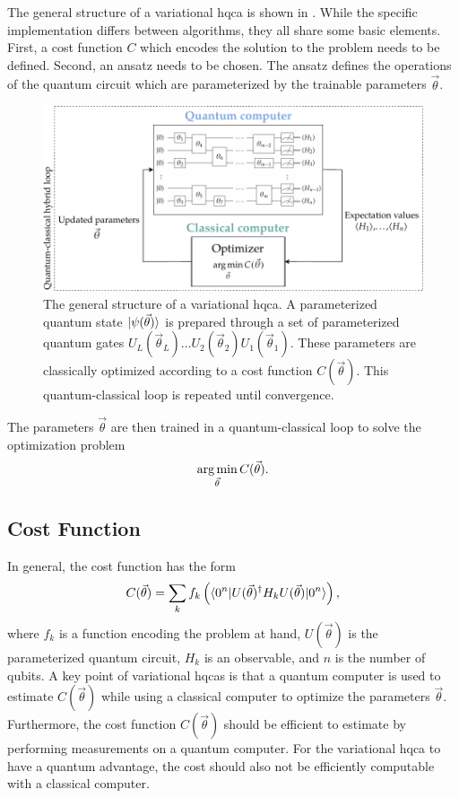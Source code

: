 The general structure of a variational \gls{hqca} is shown in .
While the specific implementation differs between algorithms, they all share some basic elements.
First, a cost function $C$ which encodes the solution to the problem needs to be defined.
Second, an ansatz needs to be chosen.
The ansatz defines the operations of the quantum circuit which are parameterized by the trainable parameters $\vec{\theta}$.
\begin{figure}[ht]
    \centering
    \includegraphics[width=1\linewidth]{figures/vqa-general-structure.pdf}
    \caption[The general structure of a variational \acrshort{hqca}.]{The general structure of a variational \gls{hqca}. A parameterized quantum state $\vert{\psi(\vec{\theta})}\rangle$ is prepared through a set of parameterized quantum gates $U_L(\vec{\theta}_L) \ldots U_2(\vec{\theta}_2)U_1(\vec{\theta}_1)$. These parameters are classically optimized according to a cost function $C(\vec{\theta})$. This quantum-classical loop is repeated until convergence.}
    \label{fig:vqa-general-structure}
\end{figure}
The parameters $\vec{\theta}$ are then trained in a quantum-classical loop to solve the optimization problem
\begin{equation} \label{eqn:optimization-problem}
\operatorname*{arg\,min}_{\vec{\theta}} C(\vec{\theta}).
\end{equation}

\subsection{Cost Function}
In general, the cost function has the form
\begin{equation} \label{eqn:general-cost-function}
C(\vec{\theta}) = \sum_k f_k\left(\langle{0^n}\vert U(\vec{\theta})^\dagger H_k U(\vec{\theta})\vert{0^n}\rangle\right),
\end{equation}
where $f_k$ is a function encoding the problem at hand, $U(\vec{\theta})$ is the parameterized quantum circuit, $H_k$ is an observable, and $n$ is the number of qubits.
A key point of variational \glspl{hqca} is that a quantum computer is used to estimate $C(\vec{\theta})$ while using a classical computer to optimize the parameters $\vec{\theta}$.
Furthermore, the cost function $C(\vec{\theta})$ should be efficient to estimate by performing measurements on a quantum computer.
For the variational \gls{hqca} to have a quantum advantage, the cost should also not be efficiently computable with a classical computer.

